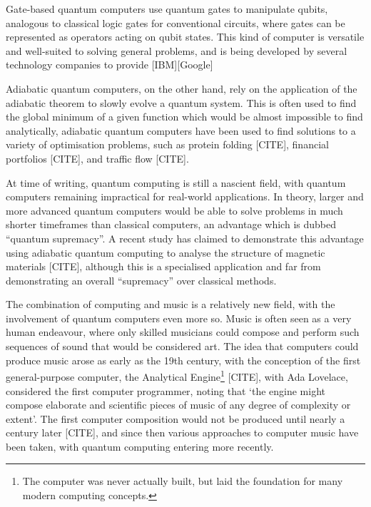 \documentclass[12pt]{article}
\theoremstyle{definition}
\begin{document}
Gate-based quantum computers use quantum gates to manipulate qubits, analogous to classical logic gates for conventional circuits, where gates can be represented as operators acting on qubit states. This kind of computer is versatile and well-suited to solving general problems, and is being developed by several technology companies to provide [IBM][Google]

Adiabatic quantum computers, on the other hand, rely on the application of the adiabatic theorem to slowly evolve a quantum system. This is often used to find the global minimum of a given function which would be almost impossible to find analytically, adiabatic quantum computers have been used to find solutions to a variety of optimisation problems, such as protein folding [CITE], financial portfolios [CITE], and traffic flow [CITE].

At time of writing, quantum computing is still a nascient field, with quantum computers remaining impractical for real-world applications. In theory, larger and more advanced quantum computers would be able to solve problems in much shorter timeframes than classical computers, an advantage which is dubbed ``quantum supremacy''. A recent study has claimed to demonstrate this advantage using adiabatic quantum computing to analyse the structure of magnetic materials [CITE], although this is a specialised application and far from demonstrating an overall ``supremacy'' over classical methods.

The combination of computing and music is a relatively new field, with the involvement of quantum computers even more so. Music is often seen as a very human endeavour, where only skilled musicians could compose and perform such sequences of sound that would be considered art. The idea that computers could produce music arose as early as the 19th century, with the conception of the first general-purpose computer, the Analytical Engine\footnote{The computer was never actually built, but laid the foundation for many modern computing concepts.} [CITE], with Ada Lovelace, considered the first computer programmer, noting that `the engine might compose elaborate and scientific pieces of music of any degree
of complexity or extent'. The first computer composition would not be produced until nearly a century later [CITE], and since then various approaches to computer music have been taken, with quantum computing entering more recently.
\end{document}
